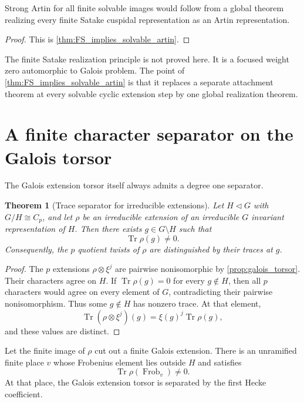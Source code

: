 \documentclass{aomart}
\newtheorem{theorem}{Theorem}[section]
\theoremstyle{definition}
\theoremstyle{remark}
\newcommand{\Frob}{\operatorname{Frob}}
\newcommand{\Tr}{\operatorname{Tr}}
\begin{document}
\begin{corollary}\label{cor:single_target}
Strong Artin for all finite solvable images would follow from a global theorem realizing every finite Satake cuspidal representation as an Artin representation.
\end{corollary}

\begin{proof}
This is \cref{thm:FS_implies_solvable_artin}.
\end{proof}

\begin{remark}\label{rem:FS_scope}
The finite Satake realization principle is not proved here. It is a focused weight zero automorphic to Galois problem. The point of \cref{thm:FS_implies_solvable_artin} is that it replaces a separate attachment theorem at every solvable cyclic extension step by one global realization theorem.
\end{remark}

\section{A finite character separator on the Galois torsor}\label{sec:galois_separator}

The Galois extension torsor itself always admits a degree one separator.

\begin{theorem}[Trace separator for irreducible extensions]\label{thm:galois_trace_separator}
Let \(H\triangleleft G\) with \(G/H\cong C_p\), and let \(\rho\) be an irreducible extension of an irreducible \(G\) invariant representation of \(H\). Then there exists \(g\in G\setminus H\) such that
\[
 \boxed{
 \Tr\rho(g)\neq0.
 }
\]
Consequently, the \(p\) quotient twists of \(\rho\) are distinguished by their traces at \(g\).
\end{theorem}

\begin{proof}
The \(p\) extensions \(\rho\otimes\xi^j\) are pairwise nonisomorphic by \cref{prop:galois_torsor}. Their characters agree on \(H\). If \(\Tr\rho(g)=0\) for every \(g\notin H\), then all \(p\) characters would agree on every element of \(G\), contradicting their pairwise nonisomorphism. Thus some \(g\notin H\) has nonzero trace. At that element,
\[
 \Tr(\rho\otimes\xi^j)(g)
 =
 \xi(g)^j\Tr\rho(g),
\]
and these values are distinct.
\end{proof}

\begin{corollary}\label{cor:chebotarev_separator}
Let the finite image of \(\rho\) cut out a finite Galois extension. There is an unramified finite place \(v\) whose Frobenius element lies outside \(H\) and satisfies
\[
 \Tr\rho(\Frob_v)\neq0.
\]
At that place, the Galois extension torsor is separated by the first Hecke coefficient.
\end{corollary}
\end{document}

